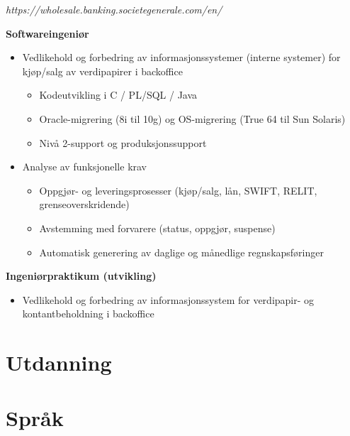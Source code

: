 \documentclass[11pt,a4paper]{moderncv}
\begin{document}
\newpage

{
	\textit{https://wholesale.banking.societegenerale.com/en/}

	\bigskip
	\textbf{Softwareingeniør}
\bigskip
\begin{itemize}
\item Vedlikehold og forbedring av informasjonssystemer (interne systemer) for kjøp/salg av verdipapirer i backoffice
	\begin{itemize}
		\item Kodeutvikling i C / PL/SQL / Java
		\item Oracle-migrering (8i til 10g) og OS-migrering (True 64 til Sun Solaris)
		\item Nivå 2-support og produksjonssupport
\end{itemize}
\bigskip
\item Analyse av funksjonelle krav
	\begin{itemize}
		\item Oppgjør- og leveringsprosesser (kjøp/salg, lån, SWIFT, RELIT, grenseoverskridende)
		\item Avstemming med forvarere (status, oppgjør, suspense)
		\item Automatisk generering av daglige og månedlige regnskapsføringer
	\end{itemize}
\end{itemize}
}
\bigskip
{}
{
\bigskip
\textbf{Ingeniørpraktikum (utvikling)}
\bigskip
\begin{itemize}
	\item Vedlikehold og forbedring av informasjonssystem for verdipapir- og kontantbeholdning i backoffice
\end{itemize}
}
\section{Utdanning}



\section{Språk}
\end{document}
